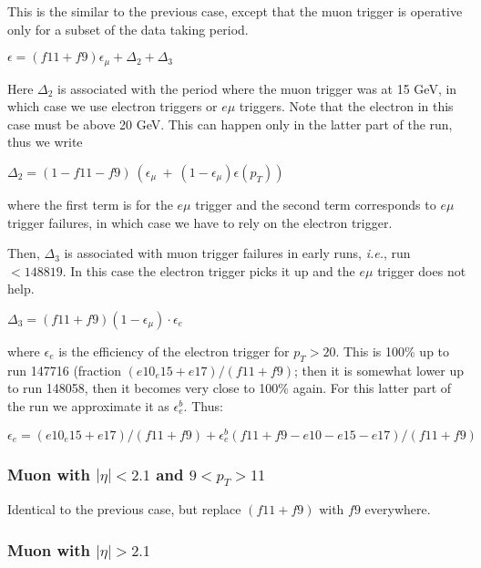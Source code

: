 This is the similar to the previous case, except that the muon 
trigger is operative only for a subset of the data taking period.

\begin{center}
$\epsilon = (f11+f9)\epsilon_{\mu} + \Delta_2 + \Delta_3$ 
\end{center}

Here $\Delta_2$ is associated with the period where the muon 
trigger was at 15 GeV, in which case we use electron triggers or
$e\mu$ triggers.  Note that the electron in this case must be
above 20 GeV.  This can happen only in the latter part of the run, 
thus we write
\begin{center}
$\Delta_2 = (1-f11-f9)~(\epsilon_{\mu}~+~
(1-\epsilon_{\mu})\epsilon(p_T))$
\end{center}
\noindent where the first term is for the $e\mu$ trigger and the 
second term corresponds to $e\mu$ trigger failures, in which case we have 
to rely on the electron trigger.

Then, $\Delta_3$ is associated with muon trigger failures in early runs, 
{\em i.e.}, run $<148819$.  In this case the electron trigger picks it 
up and the $e\mu$ trigger does not help.  

\begin{center}
$\Delta_3 = (f11+f9)(1-\epsilon_{\mu}) \cdot \epsilon_e$
\end{center}

\noindent where $\epsilon_e$ is the efficiency of the electron
trigger for $p_T>20$.  This is 100\% up to run 147716 (fraction
$(e10_e15+e17)/(f11+f9)$;  then it is somewhat lower up to
run 148058, then it becomes very close to 100\% again.
For this latter part of the run we approximate it as $\epsilon_e^b$.
Thus:

\begin{center}
$\epsilon_e = (e10_e15+e17)/(f11+f9) + 
\epsilon_e^b(f11+f9-e10-e15-e17)/(f11+f9)$
\end{center}

\subsubsection{Muon with $|\eta|<2.1$ and $9<p_T>11$}

Identical to the previous case, but replace $(f11+f9)$ with $f9$ everywhere.

\subsubsection{Muon with $|\eta|>2.1$}

